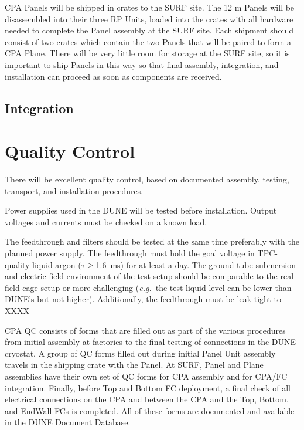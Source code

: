 CPA Panels will be shipped in crates to the SURF site.  The 12 m Panels will be disassembled into their three RP Units, loaded into the crates with all hardware needed to complete the Panel assembly at the SURF site.  Each shipment should consist of two crates which contain the two Panels that will be paired to form a CPA Plane.  There will be very little room for storage at the SURF site, so it is important to ship Panels in this way so that final assembly, integration, and installation can proceed as soon as components are received.

\subsection{Integration }
\label{sec:fddp-hv-install-pds-elec}

\section{Quality Control}
There will be excellent quality control, based on documented assembly, testing, transport, and installation procedures.
\label{sec:fddp-hv-qc}

Power supplies used in the DUNE will be tested before installation.  Output voltages and currents must be checked on a known load. 

The feedthrough and filters should be tested at the same time preferably with the planned power supply.  The feedthrough must hold the goal  voltage in TPC-quality liquid argon ($\tau\geq$\SI{1.6}{ms}) for at least a day.  The ground tube submersion and electric field environment of the test setup should be comparable to the real field cage setup or more challenging ({\it e.g.}\ the test liquid level can be lower than DUNE's but not higher).  Additionally, the feedthrough must be leak tight to XXXX 

CPA QC consists of forms that are filled out as part of the various procedures from initial assembly at factories to the final testing of connections in the DUNE cryostat.  A group of QC forms filled out during initial Panel Unit assembly travels in the shipping crate with the Panel.  At SURF, Panel and Plane assemblies have their own set of QC forms for CPA assembly and for CPA/FC integration.  Finally, before Top and Bottom FC deployment, a final check of all electrical connections on the CPA and between the CPA and the Top, Bottom, and EndWall FCs is completed.  All of these forms are documented and available in the DUNE Document Database.

